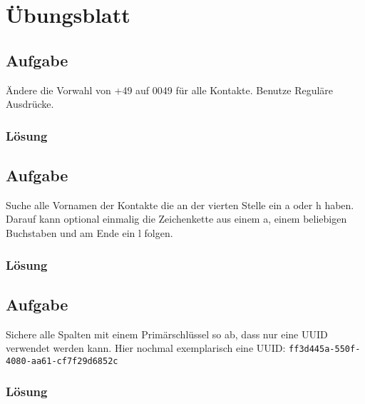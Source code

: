 \section{Übungsblatt}
\label{sec:uebung_05}

\subsection{Aufgabe}
\label{sec:uebung_05.aufgabe_01}
Ändere die Vorwahl von +49 auf 0049 für alle Kontakte. Benutze Reguläre Ausdrücke.

\subsubsection*{Lösung}
\label{sec:uebung_05.aufgabe_01.loesung}


\subsection{Aufgabe}
\label{sec:uebung_05.aufgabe_02}
Suche alle Vornamen der Kontakte die an der vierten Stelle ein a oder h haben. Darauf kann optional einmalig die Zeichenkette aus einem a, einem beliebigen Buchstaben und am Ende ein l folgen.

\subsubsection*{Lösung}
\label{sec:uebung_05.aufgabe_02.loesung}


\subsection{Aufgabe}
\label{sec:uebung_05.aufgabe_03}
Sichere alle Spalten mit einem Primärschlüssel so ab, dass nur eine UUID verwendet werden kann.
Hier nochmal exemplarisch eine UUID: \texttt{ff3d445a-550f-4080-aa61-cf7f29d6852c}

\subsubsection*{Lösung}
\label{sec:uebung_05.aufgabe_03.loesung}

